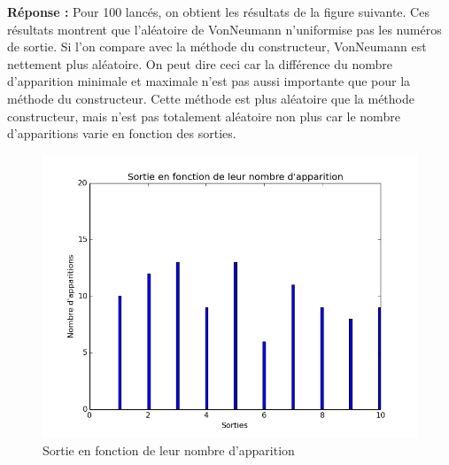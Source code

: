 \documentclass[oneside]{book}
\begin{document}
\begin{enumerate}
	\textbf{Réponse :} \newline
	Pour 100 lancés, on obtient les résultats de la figure suivante. Ces résultats montrent que l'aléatoire de VonNeumann n'uniformise pas les numéros de sortie. Si l'on compare avec la méthode du constructeur, VonNeumann est nettement plus aléatoire. On peut dire ceci car la différence du nombre d'apparition minimale et maximale n'est pas aussi importante que pour la méthode du constructeur.\newline
	Cette méthode est plus aléatoire que la méthode constructeur, mais n'est pas totalement aléatoire non plus car le nombre d'apparitions varie en fonction des sorties.
	\begin{figure}[h!]
		\centering
			\includegraphics[width=\textwidth]{VonNeumann.png}
		\caption{Sortie en fonction de leur nombre d'apparition}
\end{figure}
\end{enumerate}
\end{document}
